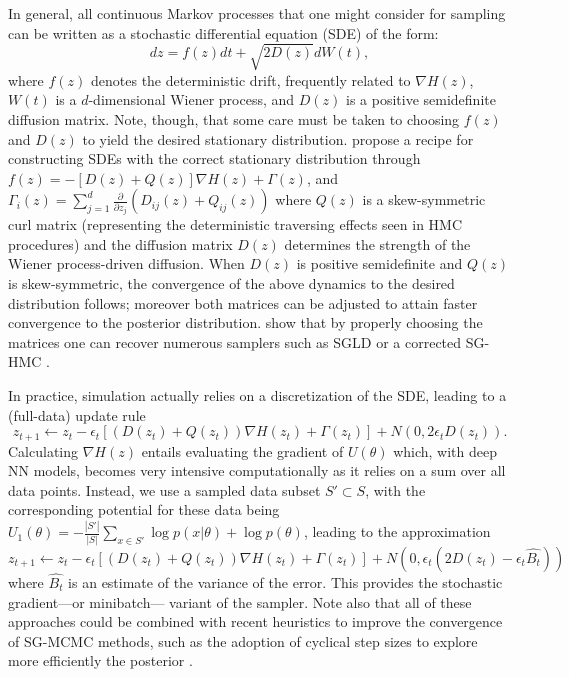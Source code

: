 In general, all continuous Markov processes that one might consider for sampling can be written
as a stochastic differential equation (SDE) of the form:
\begin{equation}
dz = f(z)dt +
\sqrt{ 2D(z)}dW(t),
\end{equation}
where $f(z)$ denotes the deterministic drift, frequently
related to $\nabla H(z)$,
$W(t)$  is a $d$-dimensional Wiener process, and 
$D(z)$ is a positive semidefinite diffusion matrix. Note, though,
that some care must be taken to choosing $f(z)$ and $D(z)$ 
to yield the desired stationary distribution.
\cite{ma2015complete} propose a recipe for constructing SDEs with the correct stationary distribution through 
$f(z) = - [D(z) + Q(z)] \nabla H(z) + \Gamma (z)$, 
and $\Gamma _i (z) = \sum _{j=1}^d 
\frac{\partial  }{\partial z_j}(D_{ij} (z) + Q_{ij} (z) )
$
where $ Q(z)$ is a skew-symmetric curl matrix (representing the deterministic traversing effects seen
in HMC procedures) and the diffusion matrix $D(z)$
determines the strength of the Wiener process-driven diffusion.
When 
$D(z)$ is positive semidefinite and $Q(z)$ is skew-symmetric, 
 the convergence of the above dynamics to the desired 
distribution follows; moreover both matrices can be adjusted to attain faster convergence to
the posterior distribution. \cite{ma2015complete} show that by properly choosing the matrices  one can recover numerous samplers such
as SGLD \cite{welling2011bayesian} or a corrected SG-HMC \cite{chen2014stochastic}.

In practice, simulation actually relies on a discretization of the SDE, leading to a (full-data) update rule
\begin{equation}
z_{t+1} \leftarrow z_t - \epsilon_t \left[ ( D(z_t) + Q(z_t) )
\nabla H(z_t) + \Gamma (z_t)\right]
+ N (0, 2\epsilon _t D(z_t)).
\end{equation} 
Calculating $\nabla H(z)$ entails evaluating the gradient of $U(\theta )$
which, with deep NN models, 
 becomes very intensive computationally as it relies on a sum
over all data points. Instead, 
we use a sampled data subset $S' \subset S$, with the corresponding potential for these data being 
$U_1 (\theta ) = -\frac{|S'|}{|S|} \sum _{x \in S'}
\log p(x|\theta ) + \log p(\theta )$, leading 
to the approximation 
\begin{equation}
z_{t+1} \leftarrow z_t - \epsilon_t \left[ ( D(z_t) + Q(z_t) )
\nabla H (z_t) + \Gamma (z_t) \right]
+ N (0, \epsilon _t (2 D(z_t)- \epsilon_t \hat {B_t}))
\end{equation} 
where $\hat {B_t}$ is an estimate of the variance of the error.
This provides the  stochastic gradient—or minibatch— variant of the sampler. Note also that all of these approaches could be combined with recent heuristics to improve the convergence of SG-MCMC methods, such as the adoption of cyclical step sizes to explore more efficiently the posterior  \cite{7926641}.


